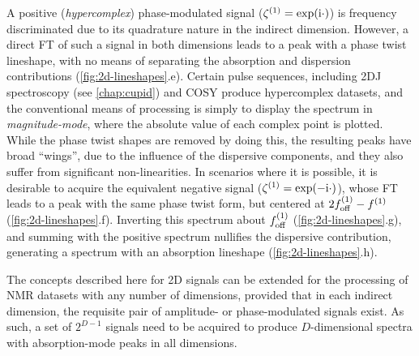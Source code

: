 A positive (\emph{hypercomplex}) phase-modulated signal ($\zeta^{(1)}
= \exp(\mathrm{i} \cdot)$) is frequency discriminated due to
its quadrature nature in the indirect dimension. However, a direct \ac{FT} of
such a signal in both dimensions leads to a peak with a phase twist lineshape,
with no means of
separating the absorption and dispersion contributions (\cref{fig:2d-lineshapes}.e). Certain pulse
sequences, including \ac{2DJ} spectroscopy\cite{Aue1976,Morris2009} (see
\cref{chap:cupid}) and
\ac{COSY}\cite{Jeener1971,Jeener2016,Aue1976a} produce hypercomplex datasets,
and the conventional means of processing is simply to display the
spectrum in \emph{magnitude-mode}, where the absolute value of each complex
point is plotted. While the phase twist shapes are removed by doing this, the
resulting peaks have broad ``wings'', due to the influence of the
dispersive components, and they also suffer from significant non-linearities.
In scenarios where it is possible, it is desirable to acquire the equivalent
negative signal ($\zeta^{(1)} = \exp(-\mathrm{i} \cdot)$), whose \ac{FT} leads to a
peak with the same phase twist form, but centered at $2f_{\mathrm{off}}^{(1)} - f^{(1)}$
(\cref{fig:2d-lineshapes}.f).
Inverting this spectrum about $f_{\mathrm{off}}^{(1)}$ (\cref{fig:2d-lineshapes}.g), and summing with the positive
spectrum nullifies the dispersive contribution, generating a spectrum with an
absorption lineshape\cite{Davis1992} (\cref{fig:2d-lineshapes}.h).

The concepts described here for \ac{2D} signals can be extended for the
processing of \ac{NMR} datasets with any number of dimensions, provided that in
each indirect dimension, the requisite pair of amplitude- or phase-modulated
signals exist. As such, a set of $2^{D-1}$ signals need to be acquired to
produce $D$-dimensional spectra with absorption-mode peaks in all dimensions.

